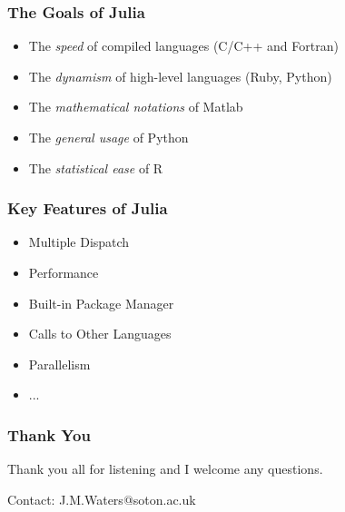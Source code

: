 \documentclass{beamer}
\begin{document}
\begin{frame}
	\frametitle{The Goals of Julia}
	\begin{itemize}
		\item The \textit{speed} of compiled languages (C/C++ and Fortran) \newline
		\item The \textit{dynamism} of high-level languages (Ruby, Python) \newline
		\item The \textit{mathematical notations} of Matlab \newline
		\item The \textit{general usage} of Python \newline
		\item The \textit{statistical ease} of R
	\end{itemize}
\end{frame}

\begin{frame}
	\frametitle{Key Features of Julia}

	\begin{itemize}
		\item Multiple Dispatch \newline
		\item Performance \newline
		\item Built-in Package Manager \newline
		\item Calls to Other Languages \newline
		\item Parallelism \newline
		\item ...
	\end{itemize}
\end{frame}

\begin{frame}
	\frametitle{Thank You}
	\begin{center}
		Thank you all for listening and I welcome any questions. \newline

		Contact: J.M.Waters@soton.ac.uk
	\end{center}
\end{frame}
\end{document}

